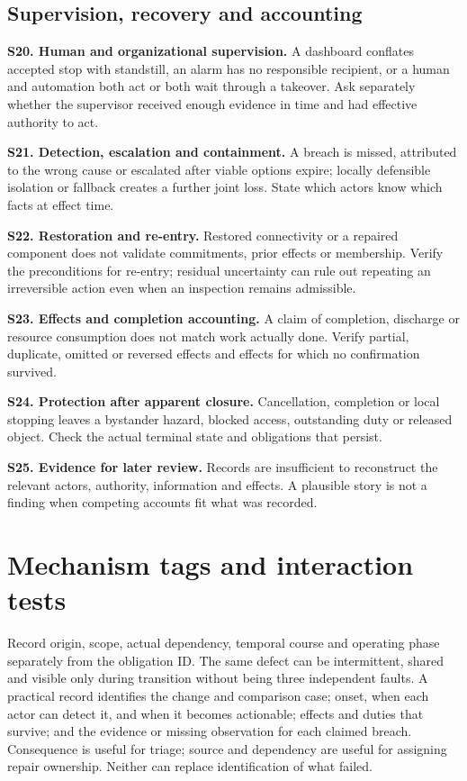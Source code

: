 \documentclass[11pt]{article}
\newcommand{\entry}[3]{\par\smallskip\noindent\textbf{#1. #2.} #3\par}
\begin{document}
\subsection{Supervision, recovery and accounting}
\entry{S20}{Human and organizational supervision}{A dashboard conflates accepted stop with standstill, an alarm has no responsible recipient, or a human and automation both act or both wait through a takeover. Ask separately whether the supervisor received enough evidence in time and had effective authority to act.}
\entry{S21}{Detection, escalation and containment}{A breach is missed, attributed to the wrong cause or escalated after viable options expire; locally defensible isolation or fallback creates a further joint loss. State which actors know which facts at effect time.}
\entry{S22}{Restoration and re-entry}{Restored connectivity or a repaired component does not validate commitments, prior effects or membership. Verify the preconditions for re-entry; residual uncertainty can rule out repeating an irreversible action even when an inspection remains admissible.}
\entry{S23}{Effects and completion accounting}{A claim of completion, discharge or resource consumption does not match work actually done. Verify partial, duplicate, omitted or reversed effects and effects for which no confirmation survived.}
\entry{S24}{Protection after apparent closure}{Cancellation, completion or local stopping leaves a bystander hazard, blocked access, outstanding duty or released object. Check the actual terminal state and obligations that persist.}
\entry{S25}{Evidence for later review}{Records are insufficient to reconstruct the relevant actors, authority, information and effects. A plausible story is not a finding when competing accounts fit what was recorded.}

\section{Mechanism tags and interaction tests}
Record origin, scope, actual dependency, temporal course and operating phase separately from the obligation ID. The same defect can be intermittent, shared and visible only during transition without being three independent faults. A practical record identifies the change and comparison case; onset, when each actor can detect it, and when it becomes actionable; effects and duties that survive; and the evidence or missing observation for each claimed breach. Consequence is useful for triage; source and dependency are useful for assigning repair ownership. Neither can replace identification of what failed.
\end{document}
